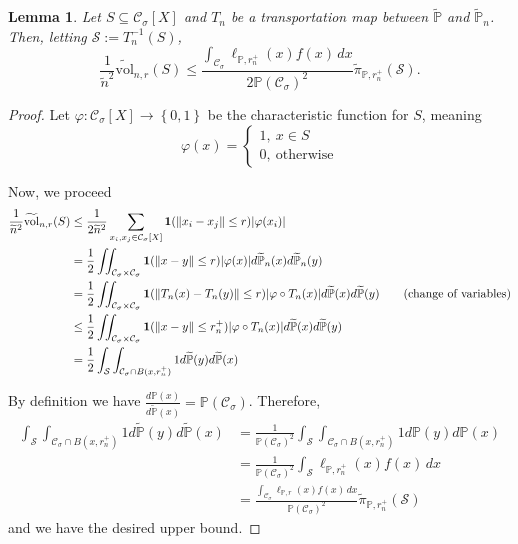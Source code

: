 \documentclass{article}
\DeclarePairedDelimiter\abs{\lvert}{\rvert}
\newcommand{\set}[1]{\left\{#1\right\}}
\newcommand{\vol}{\mathrm{vol}}
\newcommand{\norm}[1]{\left\lVert#1\right\rVert}
\newcommand{\1}{\mathbf{1}}
\newcommand{\Xbf}{X}             %
\newcommand{\Pbb}{\mathbb{P}}
\newcommand{\Sset}{\mathcal{S}}
\newcommand{\Cset}{\mathcal{C}}
\newcommand{\Csig}{\Cset_{\sigma}}
\newcommand{\dx}{\,dx}
\newcommand{\piwt}{\widetilde{\pi}}
\theoremstyle{aldenthm}
\newtheorem{lemma}{Lemma}
\theoremstyle{aldenrmrk}
\begin{document}
\begin{lemma}
	\label{lem: volume_bound}
	Let $S \subseteq \Csig[\Xbf]$ and $T_n$ be a transportation map between $\widetilde{\Pbb}$ and $\widetilde{\Pbb}_n$. Then, letting $\Sset := T_n^{-1}(S)$,
	\begin{equation*}
	\frac{1}{\widetilde{n}^2}\widetilde{\vol}_{n,r}(S) \leq \frac{\int_{\Csig} \ell_{\Pbb,r_n^+}(x) f(x) \dx}{2 \Pbb(\Csig)^2} \piwt_{\Pbb,r_n^+}(\Sset).
	\end{equation*}
\end{lemma}
\begin{proof}
	Let $\varphi: \Csig[\Xbf] \to \set{0,1}$ be the characteristic function for $S$, meaning
	\begin{equation*}
	\varphi(x) = 
	\begin{cases}
	1,~ x \in S \\
	0,~ \text{otherwise}
	\end{cases}
	\end{equation*}
	
	Now, we proceed
	\begin{align}
	\frac{1}{\widetilde{n}^2} \widetilde{\vol}_{n,r}(S) & \leq \frac{1}{2 \widetilde{n}^2} \sum_{x_i, x_j \in \Csig[\Xbf]} \1(\norm{x_i - x_j} \leq r) \abs{\varphi(x_i)} \nonumber \\
	& = \frac{1}{2}\iint_{\Csig \times \Csig} \1(\norm{x - y} \leq r) \abs{\varphi(x)} d\widetilde{\Pbb}_n(x) d\widetilde{\Pbb}_n(y) \nonumber \\
	& = \frac{1}{2} \iint_{\Csig \times \Csig} \1(\norm{T_n(x) - T_n(y)} \leq r) \abs{\varphi \circ T_n(x)} d\widetilde{\Pbb}(x) d\widetilde{\Pbb}(y) \tag{change of variables} \nonumber \\
	& \leq \frac{1}{2}\iint_{\Csig \times \Csig} \1(\norm{x - y} \leq r_n^+) \abs{\varphi \circ T_n(x)} d\widetilde{\Pbb}(x) d\widetilde{\Pbb}(y) \nonumber \\
	& = \frac{1}{2}\int_{\Sset} \int_{\Csig \cap B(x,r_n^+)} 1 d\widetilde{\Pbb}(y) d\widetilde{\Pbb}(x) \nonumber
	\end{align}
	
	By definition we have $\frac{d\Pbb(x)}{d\widetilde{\Pbb}(x)} = \Pbb(\Csig)$. Therefore,
	\begin{align*}
	\int_{\Sset} \int_{\Csig \cap B(x,r_n^+)} 1 d\widetilde{\Pbb}(y) d\widetilde{\Pbb}(x) & = \frac{1}{\Pbb(\Csig)^2}\int_{\Sset} \int_{\Csig \cap B(x,r_n^+)} 1 d\Pbb(y) d\Pbb(x) \\
	& = \frac{1}{\Pbb(\Csig)^2}\int_{\Sset} \ell_{\Pbb,r_n^+}(x) f(x) \dx \\
	& = \frac{\int_{\Csig} \ell_{\Pbb,r}(x) f(x) \dx}{\Pbb(\Csig)^2} \piwt_{\Pbb,r_n^+}(\Sset)
	\end{align*}
	and we have the desired upper bound.
\end{proof}
\end{document}

